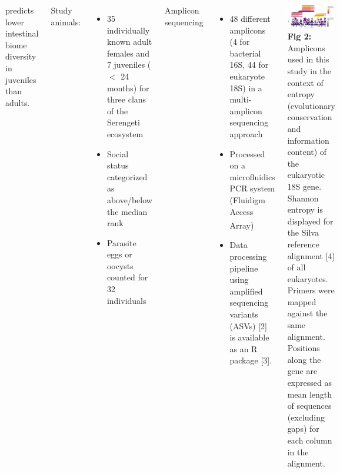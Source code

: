 \documentclass[30pt, a0paper, portrait, margin=0mm, innermargin=15mm,
               blockverticalspace=15mm, colspace=15mm, subcolspace=8mm]{tikzposter}
\begin{document}
\begin{columns}
{\begin{minipage}{0.5\linewidth}
\begin{itemize}
{   predicts lower intestinal biome diversity in juveniles than
   adults.}
 \end{itemize}
\end{minipage} 
\hfill
}
      {
        Study animals:
        \begin{itemize}
        \item 35 individually known adult females and 7 juveniles ($<$
          24 months) for three clans of the Serengeti ecosystem
        \item Social status categorized as above/below the median rank
        \item Parasite eggs or oocysts counted for 32 individuals
        \end{itemize}
        Amplicon sequencing
        \begin{itemize}
        \item{48 different amplicons (4 for bacterial 16S, 44 for
          eukaryote 18S) in a multi-amplicon sequencing approach}
        \item{Processed on a microfluidics PCR system (Fluidigm Access
          Array\textsuperscript{\textregistered})}
        \item{Data processing pipeline using amplified sequencing
          variants (ASVs) [2] is available as an R package [3].}
        \end{itemize}
        \includegraphics[width=1\linewidth]{entropy_primers_norm_woName.png}
        \textbf{Fig 2:} Amplicons used in this study in the context of
        entropy (evolutionary conservation and information content) of
        the eukaryotic 18S gene. Shannon entropy is displayed for the
        Silva reference alignment [4] of all eukaryotes. Primers were
        mapped against the same alignment. Positions along the gene
        are expressed as mean length of sequences (excluding gaps) for
        each column in the alignment.}
      

\end{columns}
\end{document}
